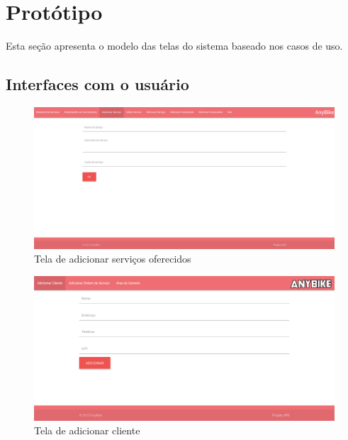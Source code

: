 \documentclass[
	12pt,				%
	openright,
	oneside,			%
	a4paper,			%
	chapter=TITLE,		%
	brazil				%
	]{abntex2}
\begin{document}











\newpage
\chapter{Protótipo}

Esta seção apresenta o modelo das telas do sistema baseado nos casos de uso.

\section{Interfaces com o usuário}

\begin{figure}[htb]
	\caption{Tela de adicionar serviços oferecidos}
	\begin{center}
	    \includegraphics[scale=0.3]{Arquivos/adicionar_servico}  
	\end{center}
\end{figure}


\begin{figure}[htb]
	\caption{Tela de adicionar cliente}
	\begin{center}
	    \includegraphics[scale=0.3]{Arquivos/adicionar_cliente}  
	\end{center}
\end{figure}
\end{document}
